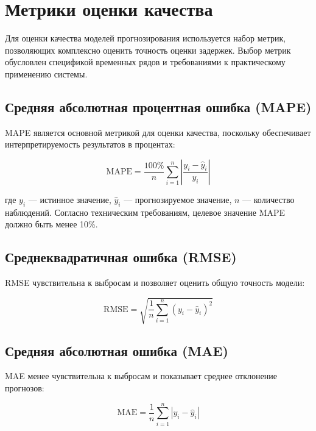 \section{Метрики оценки качества}
\label{sec:evaluation_metrics}

\hspace*{1.25cm}Для оценки качества моделей прогнозирования используется набор метрик, позволяющих комплексно оценить точность оценки задержек. Выбор метрик обусловлен спецификой временных рядов и требованиями к практическому применению системы.

\subsection{Средняя абсолютная процентная ошибка (MAPE)}

\hspace*{1.25cm}MAPE является основной метрикой для оценки качества, поскольку обеспечивает интерпретируемость результатов в процентах:

\begin{equation}
	\text{MAPE} = \frac{100\%}{n} \sum_{i=1}^{n} \left| \frac{y_i - \hat{y}_i}{y_i} \right|
\end{equation}

где $y_i$ — истинное значение, $\hat{y}_i$ — прогнозируемое значение, $n$ — количество наблюдений. Согласно техническим требованиям, целевое значение MAPE должно быть менее 10\%.

\subsection{Среднеквадратичная ошибка (RMSE)}

\hspace*{1.25cm}RMSE чувствительна к выбросам и позволяет оценить общую точность модели:

\begin{equation}
	\text{RMSE} = \sqrt{\frac{1}{n} \sum_{i=1}^{n} (y_i - \hat{y}_i)^2}
\end{equation}

\subsection{Средняя абсолютная ошибка (MAE)}

\hspace*{1.25cm}MAE менее чувствительна к выбросам и показывает среднее отклонение прогнозов:

\begin{equation}
	\text{MAE} = \frac{1}{n} \sum_{i=1}^{n} |y_i - \hat{y}_i|
\end{equation} 